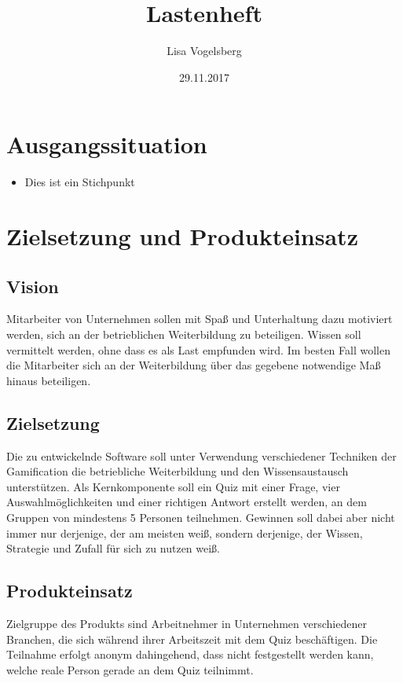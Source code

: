 \documentclass[11pt,a4paper]{scrreprt}
\title{Lastenheft}
\author{Lisa Vogelsberg}
\date{29.11.2017}
\begin{document}
\tableofcontents
\chapter{Ausgangssituation}

\begin{itemize}
\item Dies ist ein Stichpunkt
\end{itemize}
\chapter{Zielsetzung und Produkteinsatz}
\section{Vision}
Mitarbeiter von Unternehmen sollen mit Spaß und Unterhaltung dazu motiviert werden, sich an der betrieblichen Weiterbildung zu beteiligen. Wissen soll vermittelt werden, ohne dass es als Last empfunden wird. Im besten Fall wollen die Mitarbeiter sich an der Weiterbildung über das gegebene notwendige Maß hinaus beteiligen.
\section{Zielsetzung}
Die zu entwickelnde Software soll unter Verwendung verschiedener Techniken der Gamification die betriebliche Weiterbildung und den Wissensaustausch unterstützen.
Als Kernkomponente soll ein Quiz mit einer Frage, vier Auswahlmöglichkeiten und einer richtigen Antwort erstellt werden, an dem Gruppen von mindestens 5 Personen teilnehmen.
Gewinnen soll dabei aber nicht immer nur derjenige, der am meisten weiß, sondern derjenige, der Wissen, Strategie und Zufall für sich zu nutzen weiß.
\section{Produkteinsatz}
Zielgruppe des Produkts sind Arbeitnehmer in Unternehmen verschiedener Branchen, die sich während ihrer Arbeitszeit mit dem Quiz beschäftigen. Die Teilnahme erfolgt anonym dahingehend, dass nicht festgestellt werden kann, welche reale Person gerade an dem Quiz teilnimmt.
\end{document}
